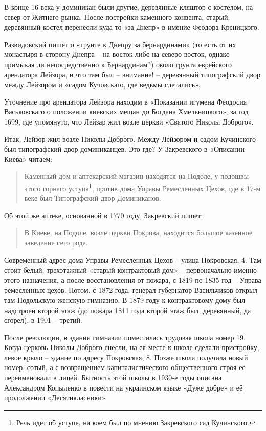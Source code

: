 В конце 16 века у доминикан были другие, деревянные кляштор с костелом, на север от Житнего рынка. После постройки каменного конвента, старый, деревянный костел перенесли куда-то «за Днепр» в имение Феодора Креницкого.

Развидовский пишет о «грунте к Днепру за бернардинами» (то есть от их монастыря в сторону Днепра – на восток либо на северо-восток, однако примыкая ли непосредственно к Бернардинам?) около грунта еврейского арендатора Лейзора, и что там был – внимание! – деревянный типографский двор между Лейзором и «садом Кучовскаго, где ведьмы слетались». 

Уточнение про арендатора Лейзора находим в «Показании игумена Феодосия Васьковскаго о положении киевских мещан до Богдана Хмельницкого», за год 1699, где упомянуто, что Лейзар жил возле церкви «Святого Николы Доброго».

Итак, Лейзор жил возле Николы Доброго. Между Лейзором и садом Кучинского был типографский двор доминиканцев. Это где? У Закревского в «Описании Киева» читаем\cite{zakr01}:

\begin{quotation}
Каменный дом и аптекарский магазин находятся на Подоле, у подошвы этого горнаго уступа\footnote{Речь идет об уступе, на коем был по мнению Закревского сад Кучинского.}, против дома Управы Ремесленных Цехов, где в 17-м веке был Типографский двор Доминиканов.
\end{quotation}

Об этой же аптеке, основанной в 1770 году, Закревский пишет: 

\begin{quotation}
В Киеве, на Подоле, возле церкви Покрова, находится большое казенное заведение сего рода.
\end{quotation}

Современный адрес дома Управы Ремесленных Цехов – улица Покровская, 4. Там стоит белый, трехэтажный «старый контрактовый дом» – первоначально именно этого назначения, а после восстановления от пожара, с 1819 по 1835 год – Управа ремесленных цехов. Потом, с 1872 года, генерал-губернатор Васильчиков открыл там Подольскую женскую гимназию. В 1879 году к контрактовому дому был надстроен второй этаж (до пожара 1811 года второй этаж был, деревянный, да сгорел), в 1901 – третий. 

После революции, в здании гимназии поместилась трудовая школа номер 19. Когда церковь Николы Доброго снесли, на ея месте к школе сделали пристройку, левое крыло – здание по адресу Покровская, 8. Позже школа получила новый номер, сотый, а с возвращением капиталистического общественного строя её переименовали в лицей. Бытность этой школы в 1930-е годы описана Александром Копыленко в повести на украинском языке «Дуже добре» и её продолжении «Десятикласники».

